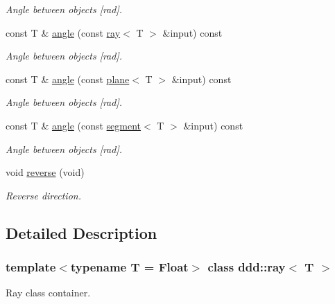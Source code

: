 \begin{DoxyCompactItemize}
\begin{DoxyCompactList}\small\item\em Angle between objects \mbox{[}rad\mbox{]}. \end{DoxyCompactList}\item 
const T \& \hyperlink{classddd_1_1ray_a2d95fa78240a0e66d36cff629e5a8e0b}{angle} (const \hyperlink{classddd_1_1ray}{ray}$<$ T $>$ \&input) const
\begin{DoxyCompactList}\small\item\em Angle between objects \mbox{[}rad\mbox{]}. \end{DoxyCompactList}\item 
const T \& \hyperlink{classddd_1_1ray_ac7fa512fde0e202a0f64463b12ea7e11}{angle} (const \hyperlink{classddd_1_1plane}{plane}$<$ T $>$ \&input) const
\begin{DoxyCompactList}\small\item\em Angle between objects \mbox{[}rad\mbox{]}. \end{DoxyCompactList}\item 
const T \& \hyperlink{classddd_1_1ray_ab634fe1fa02504d0b5de85555be324d5}{angle} (const \hyperlink{classddd_1_1segment}{segment}$<$ T $>$ \&input) const
\begin{DoxyCompactList}\small\item\em Angle between objects \mbox{[}rad\mbox{]}. \end{DoxyCompactList}\item 
\mbox{\label{classddd_1_1ray_a1a55daac434b754f4fb951a8dba6b4c9}} 
void \hyperlink{classddd_1_1ray_a1a55daac434b754f4fb951a8dba6b4c9}{reverse} (void)
\begin{DoxyCompactList}\small\item\em Reverse direction. \end{DoxyCompactList}\end{DoxyCompactItemize}


\subsection{Detailed Description}
\subsubsection*{template$<$typename T = Float$>$\newline
class ddd\+::ray$<$ T $>$}

Ray class container. 

